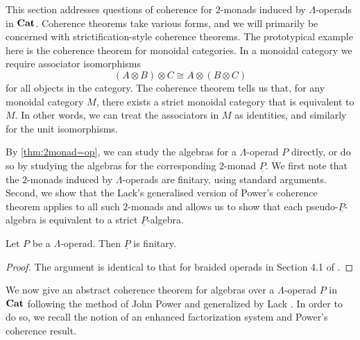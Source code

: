 This section addresses questions of coherence for $2$-monads induced by $\Lambda$-operads in $\mathbf{Cat}$. Coherence theorems take various forms, and we will primarily be concerned with strictification-style coherence theorems. The prototypical example here is the coherence theorem for monoidal categories. In a monoidal category we require associator isomorphisms
    \[
        \left( A \otimes B \right) \otimes C \cong A \otimes \left( B \otimes C \right)
    \]
for all objects in the category. The coherence theorem tells us that, for any monoidal category $M$, there exists a strict monoidal category that is equivalent to $M$. In other words, we can treat the associators in $M$ as identities, and similarly for the unit isomorphisms.

By \cref{thm:2monad=op}, we can study the algebras for a $\Lambda$-operad $P$ directly, or do so by studying the algebras for the corresponding $2$-monad $\underline{P}$. We first note that the $2$-monads induced by $\Lambda$-operads are finitary, using standard arguments. Second, we show that the Lack's generalised version \cite[Theorem 4.10]{lack-cod} of Power's coherence theorem \cite[Theorem 3.4]{power-gen} applies to all such $2$-monads and allows us to show that each pseudo-$\underline{P}$-algebra is equivalent to a strict $\underline{P}$-algebra.

\begin{prop}
Let $P$ be a $\Lambda$-operad. Then $\underline{P}$ is finitary.
\end{prop}
\begin{proof}
The argument is identical to that for braided operads in Section 4.1 of \cite{lack-cod}.
\end{proof}

We now give an abstract coherence theorem for algebras over a $\Lambda$-operad $P$ in $\mathbf{Cat}$ following the method of John Power \cite{power-gen} and generalized by Lack \cite{lack-cod}. In order to do so, we recall the notion of an enhanced factorization system and Power's coherence result.

